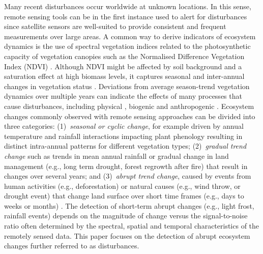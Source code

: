 \documentclass[authoryear,preprint,review,10pt]{elsarticle}
\begin{document}
Many recent disturbances occur worldwide at unknown locations. In this sense, remote sensing tools can be in the first instance used to alert for disturbances since satellite sensors are well-suited to provide consistent and frequent measurements over large areas. A common way to derive indicators of ecosystem dynamics is the use of spectral vegetation indices related to the photosynthetic capacity of vegetation canopies such as the Normalised Difference Vegetation Index (NDVI) \citep[][]{Myneni1995, Pettorelli:2005ed, Potter2003}.  Although NDVI might be affected by soil background and a saturation effect at high biomass levels, it captures seasonal and inter-annual changes in vegetation status \citep{Huete2002,Myneni:1997ur}. Deviations from average season-trend vegetation dynamics over multiple years can indicate the effects of many processes that cause disturbances, including physical \citep[e.g., droughts, fires, floods;][]{Funk:2009vf,Vrieling:2011da}, biogenic \citep[e.g., herbivorous insects, pathogens;][]{Hargrove2009, Stone2008, Verbesselt2009} and anthropogenic \citep[e.g., deforestation, urbanisation;][]{Asner:2011fa, Jin2005, Potter2003}. Ecosystem changes commonly observed with remote sensing approaches can be divided into three categories: 
(1)~\emph{seasonal or cyclic change}, for example driven by annual temperature and rainfall interactions impacting plant phenology resulting in distinct intra-annual patterns for different vegetation types; 
(2)~\emph{gradual trend change} such as trends in mean annual rainfall or gradual change in land management (e.g., long term drought, forest regrowth after fire) that result in changes over several years; and 
(3)~\emph{abrupt trend change}, caused by events from human activities (e.g., deforestation) or natural causes (e.g., wind throw, or drought event) that change land surface over short time frames (e.g., days to weeks or months) 
\citep{Verbesselt2009a,Verbesselt:2010wo, Vogelmann:2012hm}. The detection of short-term abrupt changes (e.g., light frost, rainfall events) depends on the magnitude of change versus the signal-to-noise ratio often determined by the spectral, spatial and temporal characteristics of the remotely sensed data. This paper focuses on the detection of abrupt ecosystem changes further referred to as disturbances. 
\end{document}
